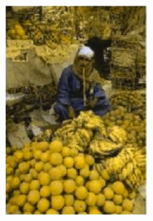 \documentclass[10pt,twocolumn,letterpaper]{article}
\begin{document}
\begin{figure}[h]
\begin{subfigure}{0.23\textwidth}
    \includegraphics[width=\textwidth]{fruits2.png}
    \caption{}
  \end{subfigure}
  \begin{subfigure}{0.23\textwidth}

\end{subfigure}
\end{figure}
\end{document}
